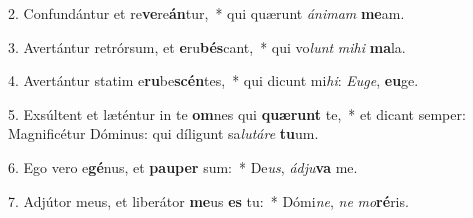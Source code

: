 2. Confundántur et re\textbf{ve}re\textbf{án}tur,~*  qui quærunt \textit{á}\textit{ni}\textit{mam} \textbf{me}am.\

3. Avertántur retrórsum, et \textbf{e}ru\textbf{bés}cant,~*  qui vo\textit{lunt} \textit{mi}\textit{hi} \textbf{ma}la.\

4. Avertántur statim e\textbf{ru}be\textbf{scén}tes,~*  qui dicunt mi\textit{hi}: \textit{Eu}\textit{ge}, \textbf{eu}ge.\

5. Exsúltent et læténtur in te \textbf{om}nes qui \textbf{quæ}\textbf{runt} te,~*  et dicant semper: Magnificétur Dóminus: qui díligunt sa\textit{lu}\textit{tá}\textit{re} \textbf{tu}um.\

6. Ego vero e\textbf{gé}nus, et \textbf{pau}\textbf{per} sum:~*  De\textit{us}, \textit{ád}\textit{ju}\textbf{va} me.\

7. Adjútor meus, et liberátor \textbf{me}us \textbf{es} tu:~*  Dómi\textit{ne}, \textit{ne} \textit{mo}\textbf{ré}ris.\

